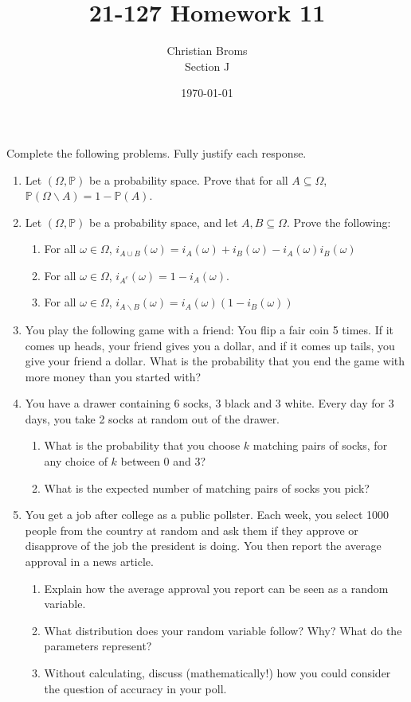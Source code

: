 \documentclass[12pt]{article}
\newcommand{\ba}{\backslash}
\renewcommand{\P}{\mathbb{P}}
\newcommand{\p}[1]{\P\left(#1\right)}
\begin{document}
\title{21-127 Homework 11
}
\author{Christian Broms \\ Section J}
\date{\today}
\maketitle
Complete the following problems. Fully justify each response.


\begin{enumerate}

\item Let $(\Omega, \P)$ be a probability space. Prove that for all $A\subseteq \Omega$, $\p{\Omega\ba A} = 1-\p{A}$.

\item Let $(\Omega, \P)$ be a probability space, and let $A, B\subseteq \Omega$. Prove the following:
\begin{enumerate}
\item For all $\omega\in\Omega$, $i_{A\cup B}(\omega) = i_{A}(\omega)+i_{B}(\omega)-i_{A}(\omega)i_{B}(\omega)$
\item For all $\omega\in\Omega$, $i_{A^c}(\omega) = 1-i_A(\omega)$.
\item For all $\omega\in\Omega$, $i_{A\ba B}(\omega) = i_A(\omega)(1-i_B(\omega))$
\end{enumerate}

\item You play the following game with a friend: You flip a fair coin 5 times. If it comes up heads, your friend gives you a dollar, and if it comes up tails, you give your friend a dollar. What is the probability that you end the game with more money than you started with?

\item You have a drawer containing 6 socks, 3 black and 3 white. Every day for 3 days, you take 2 socks at random out of the drawer.
\begin{enumerate}
\item  What is the probability that you choose $k$ matching pairs of socks, for any choice of $k$ between 0 and 3?
\item What is the expected number of matching pairs of socks you pick?
\end{enumerate}

\item You get a job after college as a public pollster. Each week, you select 1000 people from the country at random and ask them if they approve or disapprove of the job the president is doing. You then report the average approval in a news article.
\begin{enumerate}
\item Explain how the average approval you report can be seen as a random variable.
\item What distribution does your random variable follow? Why? What do the parameters represent?
\item Without calculating, discuss (mathematically!) how you could consider the question of accuracy in your poll.
\end{enumerate}


\end{enumerate}
\end{document}
